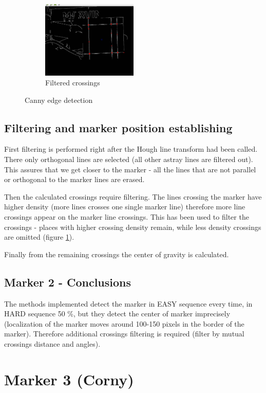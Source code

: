 \begin{figure}[ht!]
\begin{subfigure}{\textwidth}
		\centering
\includegraphics[width=0.5\textwidth]{figures/lines6}
	\caption{Filtered crossings}
	\label{fig:l6}
	\end{subfigure}
\caption{Canny edge detection}
\label{fig:linesCrossings}
\end{figure}

\subsection{Filtering and marker position establishing}
First filtering is performed right after the Hough line transform had been called. There only orthogonal lines are selected (all other astray lines are filtered out). This assures that we get closer to the marker - all the lines that are not parallel or orthogonal to the marker lines are erased.

Then the calculated crossings require filtering. The lines crossing the marker have higher density (more lines crosses one single marker line) therefore more line crossings appear on the marker line crossings. This has been used to filter the crossings - places with higher crossing density
remain, while less density crossings are omitted (figure \ref{fig:l6}). 

Finally from the remaining crossings the center of gravity
is calculated. 

\subsection{Marker 2 - Conclusions}
The methods implemented detect the marker in EASY sequence 
every time, in HARD sequence 50 \%, but they detect the center of marker imprecisely (localization of the marker moves around 100-150 pixels in the border of the marker).
Therefore additional crossings filtering is required (filter by mutual crossings distance and angles).

\newpage
\section{Marker 3 (Corny)}

